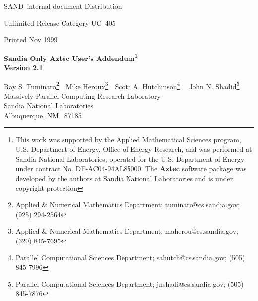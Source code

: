 \documentclass{article}[12pt]
\newcommand{\Az}  {{\bf Aztec}}
\def\draft{%
\special{!userdict begin /bop-hook{gsave
200 30 translate 65 rotate
/Times-Roman findfont 216 scalefont setfont
0 0 moveto 0.9 setgray (DRAFT) show grestore}def end}
}
\begin{document}
\large
{}


%
%
\hspace{2.22in}
SAND--internal document
\hfill
Distribution

\hspace{2.07in}
Unlimited Release
\hfill
Category UC--405
\begin{center}
Printed Nov 1999
\end{center}

\vspace{0.8in}

\begin{center}
  {\Large{\bf Sandia Only \Az{} User's Addendum\footnote{This work was supported by 
	the
        Applied Mathematical Sciences program, U.S. Department of Energy,
        Office of Energy Research, and was performed at Sandia National
        Laboratories, operated for the U.S. Department of Energy under contract
        No. DE-AC04-94AL85000. The \Az{} software package was developed by the
        authors at Sandia National Laboratories and is under copyright
        protection} \\ Version 2.1}}

\vspace*{0.4in}

Ray S. Tuminaro\footnote{Applied \& Numerical Mathematics Department;
  tuminaro@cs.sandia.gov; (925) 294-2564}
\,\,\,\,Mike Heroux\footnote{Applied \& Numerical Mathematics Department;
  maherou@cs.sandia.gov; (320) 845-7695}
\,\,\,\,Scott A. Hutchinson\footnote{Parallel Computational Sciences Department;
  sahutch@cs.sandia.gov; (505) 845-7996}
\,\,\,\, John N. Shadid\footnote{Parallel Computational Sciences Department;
  jnshadi@cs.sandia.gov; (505) 845-7876}
\\

Massively Parallel Computing Research Laboratory \\
Sandia National Laboratories \\
Albuquerque, NM \, 87185

\vspace*{.9in}

\end{center}
\end{document}
